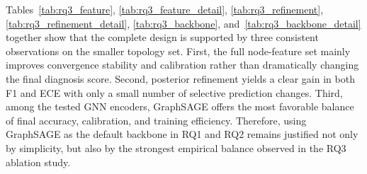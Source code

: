 Tables~\ref{tab:rq3_feature}, \ref{tab:rq3_feature_detail}, \ref{tab:rq3_refinement}, \ref{tab:rq3_refinement_detail}, \ref{tab:rq3_backbone}, and~\ref{tab:rq3_backbone_detail} together show that the complete \tool design is supported by three consistent observations on the smaller topology set. First, the full node-feature set mainly improves convergence stability and calibration rather than dramatically changing the final diagnosis score. Second, posterior refinement yields a clear gain in both F1 and ECE with only a small number of selective prediction changes. Third, among the tested GNN encoders, GraphSAGE offers the most favorable balance of final accuracy, calibration, and training efficiency. Therefore, using GraphSAGE as the default backbone in RQ1 and RQ2 remains justified not only by simplicity, but also by the strongest empirical balance observed in the RQ3 ablation study.
